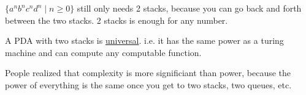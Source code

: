 \documentclass[../598comp.tex]{subfiles}
\begin{document}
$\{a^nb^nc^nd^n \mid n \geq 0\}$ still only needs 2 stacks, because you can go
back and forth between the two stacks. 2 stacks is enough for any number.
\begin{fact}
  A PDA with two stacks is \ul{universal}. i.e. it has the same power as a
  turing machine and can compute any computable function.

  People realized that complexity is more significiant than power, because the
  power of everything is the same once you get to two stacks, two queues, etc.
\end{fact}
\end{document}
